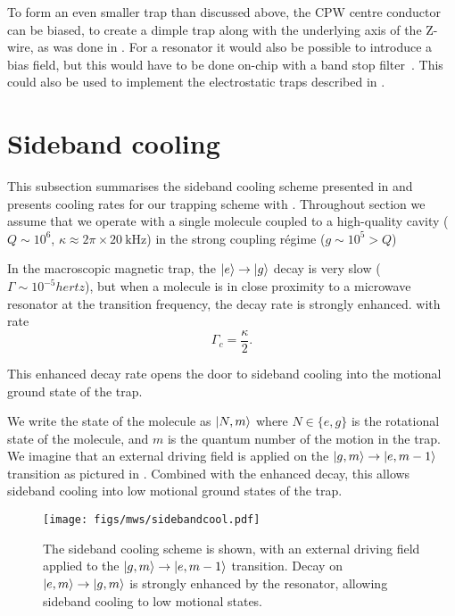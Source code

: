 To form an even smaller trap than discussed above, the CPW centre conductor can
be biased, to create a dimple trap along with the underlying axis of the
Z-wire, as was done in . For a resonator it would also
be possible to introduce a bias field, but this would have to be done on-chip
with a band stop filter~\cite{doi:10.1063/1.4808364}. This could also be used
to implement the electrostatic traps described in .




\section{Sideband cooling}


This subsection summarises the sideband cooling scheme presented in
 and presents cooling rates for our trapping scheme with
\CaF{}.  Throughout section we assume that we operate with a single molecule
coupled to a high-quality cavity ($Q\sim10^6$, $\kappa \approx
2\pi\times \SI{20}{\kilo\hertz}$) in the
strong coupling r\'egime ($g\sim10^5>Q$)

In the macroscopic magnetic trap, the
$\ket{e}\rightarrow\ket{g}$ decay is very slow ($\Gamma \sim
10^{-5}\si{hertz}$), but when a molecule is in close proximity to a microwave
resonator at the transition frequency, the decay rate is strongly enhanced. 
with rate
%
\begin{equation}
  \Gamma_c = \frac{\kappa}{2}.
\end{equation}

This enhanced decay rate opens the door to sideband cooling into the motional
ground state of the trap.

We write the state of the molecule as $\ket{N, m}$ where $N\in\{e,g\}$ is the
rotational state of the molecule, and $m$ is the quantum number of the motion
in the trap. We imagine that an external driving field is applied on the
$\ket{g, m} \rightarrow \ket{e, m-1}$ transition as pictured in
. Combined with the enhanced decay, this allows
sideband cooling into low motional ground states of the trap.

\begin{figure}[ht]
  \centering
  \texttt{[image: figs/mws/sidebandcool.pdf]}
  \caption{
    The sideband cooling scheme is shown, with an external driving field
    applied to the $\ket{g, m}\rightarrow\ket{e, m-1}$ transition. Decay on
    $\ket{e,m}\rightarrow\ket{g,m}$ is strongly enhanced by the resonator,
    allowing sideband cooling to low motional states.
  }
  \label{mws:fig:sideband}
\end{figure}


